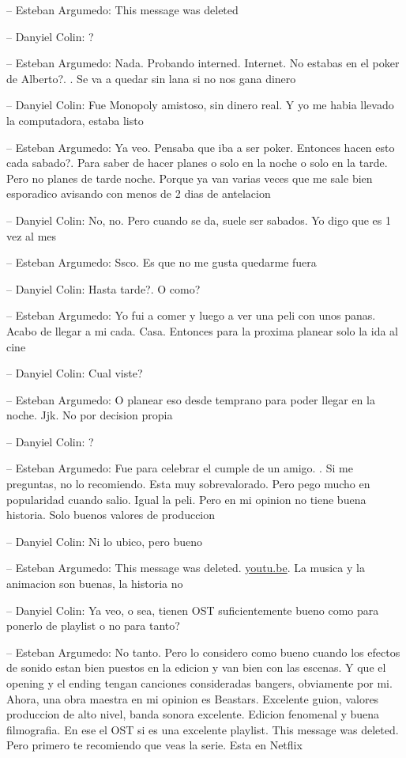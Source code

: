 -- Esteban Argumedo: This message was deleted

-- Danyiel Colin: ?

-- Esteban Argumedo: Nada. Probando interned. Internet. No estabas en el
poker de Alberto?. . Se va a quedar sin lana si no nos gana dinero

-- Danyiel Colin: Fue Monopoly amistoso, sin dinero real. Y yo me habia
llevado la computadora, estaba listo

-- Esteban Argumedo: Ya veo. Pensaba que iba a ser poker. Entonces hacen
esto cada sabado?. Para saber de hacer planes o solo en la noche o solo
en la tarde. Pero no planes de tarde noche. Porque ya van varias veces
que me sale bien esporadico avisando con menos de 2 dias de antelacion

-- Danyiel Colin: No, no. Pero cuando se da, suele ser sabados. Yo digo
que es 1 vez al mes

-- Esteban Argumedo: Ssco. Es que no me gusta quedarme fuera

-- Danyiel Colin: Hasta tarde?. O como?

-- Esteban Argumedo: Yo fui a comer y luego a ver una peli con unos
panas. Acabo de llegar a mi cada. Casa. Entonces para la proxima planear
solo la ida al cine

-- Danyiel Colin: Cual viste?

-- Esteban Argumedo: O planear eso desde temprano para poder llegar en
la noche. Jjk. No por decision propia

-- Danyiel Colin: ?

-- Esteban Argumedo: Fue para celebrar el cumple de un amigo. . Si me
preguntas, no lo recomiendo. Esta muy sobrevalorado. Pero pego mucho en
popularidad cuando salio. Igual la peli. Pero en mi opinion no tiene
buena historia. Solo buenos valores de produccion

-- Danyiel Colin: Ni lo ubico, pero bueno

-- Esteban Argumedo: This message was deleted.
\href{https://youtu.be/GwaRztMaoY0}{youtu.be}. La musica y la animacion
son buenas, la historia no

-- Danyiel Colin: Ya veo, o sea, tienen OST suficientemente bueno como
para ponerlo de playlist o no para tanto?

-- Esteban Argumedo: No tanto. Pero lo considero como bueno cuando los
efectos de sonido estan bien puestos en la edicion y van bien con las
escenas. Y que el opening y el ending tengan canciones consideradas
bangers, obviamente por mi. Ahora, una obra maestra en mi opinion es
Beastars. Excelente guion, valores produccion de alto nivel, banda
sonora excelente. Edicion fenomenal y buena filmografia. En ese el OST
si es una excelente playlist. This message was deleted. Pero primero te
recomiendo que veas la serie. Esta en Netflix

